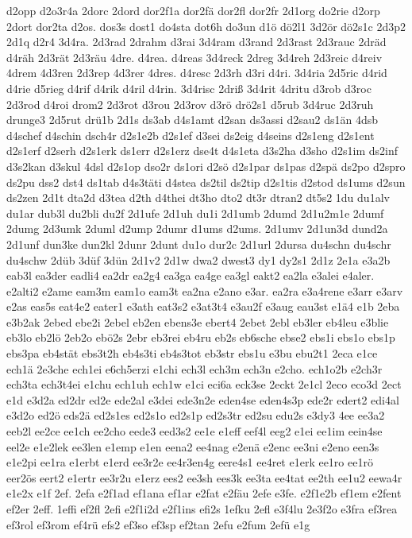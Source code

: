 {d2opp
d2o3r4a
2dorc
2dord
dor2f1a
dor2fä
dor2fl
dor2fr
2d1org
do2rie
d2orp
2dort
dor2ta
d2os.
dos3s
dost1
do4sta
dot6h
do3un
d1ö
dö2l1
3d2ör
dö2s1c
2d3p2
2d1q
d2r4
3d4ra.
2d3rad
2drahm
d3rai
3d4ram
d3rand
2d3rast
2d3rauc
2dräd
d4räh
2d3rät
2d3räu
4dre.
d4rea.
d4reas
3d4reck
2dreg
3d4reh
2d3reic
d4reiv
4drem
4d3ren
2d3rep
4d3rer
4dres.
d4resc
2d3rh
d3ri
d4ri.
3d4ria
2d5ric
d4rid
d4rie
d5rieg
d4rif
d4rik
d4ril
d4rin.
3d4risc
2driß
3d4rit
4dritu
d3rob
d3roc
2d3rod
d4roi
drom2
2d3rot
d3rou
2d3rov
d3rö
drö2s1
d5rub
3d4ruc
2d3ruh
drunge3
2d5rut
drü1b
2d1s
ds3ab
d4s1amt
d2san
ds3assi
d2sau2
ds1än
4dsb
d4schef
d4schin
dsch4r
d2s1e2b
d2s1ef
d3sei
ds2eig
d4seins
d2s1eng
d2s1ent
d2s1erf
d2serh
d2s1erk
ds1err
d2s1erz
dse4t
d4s1eta
d3s2ha
d3sho
d2s1im
ds2inf
d3s2kan
d3skul
4dsl
d2s1op
dso2r
ds1ori
d2sö
d2s1par
ds1pas
d2spä
ds2po
d2spro
ds2pu
dss2
dst4
ds1tab
d4s3täti
d4stea
ds2til
ds2tip
d2s1tis
d2stod
ds1ums
d2sun
ds2zen
2d1t
dta2d
d3tea
d2th
d4thei
dt3ho
dto2
dt3r
dtran2
dt5s2
1du
du1alv
du1ar
dub3l
du2bli
du2f
2d1ufe
2d1uh
du1i
2d1umb
2dumd
2d1u2m1e
2dumf
2dumg
2d3umk
2duml
d2ump
2dumr
d1ums
d2ums.
2d1umv
2d1un3d
dund2a
2d1unf
dun3ke
dun2kl
2dunr
2dunt
du1o
dur2c
2d1url
2dursa
du4schn
du4schr
du4schw
2düb
3düf
3dün
2d1v2
2d1w
dwa2
dwest3
dy1
dy2s1
2d1z
2e1a
e3a2b
eab3l
ea3der
eadli4
ea2dr
ea2g4
ea3ga
ea4ge
ea3gl
eakt2
ea2la
e3alei
e4aler.
e2alti2
e2ame
eam3m
eam1o
eam3t
ea2na
e2ano
e3ar.
ea2ra
e3a4rene
e3arr
e3arv
e2as
eas5s
eat4e2
eater1
e3ath
eat3s2
e3at3t4
e3au2f
e3aug
eau3st
e1ä4
e1b
2eba
e3b2ak
2ebed
ebe2i
2ebel
eb2en
ebens3e
ebert4
2ebet
2ebl
eb3ler
eb4leu
e3blie
eb3lo
eb2lö
2eb2o
ebö2s
2ebr
eb3rei
eb4ru
eb2s
eb6sche
ebse2
ebs1i
ebs1o
ebs1p
ebs3pa
eb4stät
ebs3t2h
eb4s3ti
eb4s3tot
eb3str
ebs1u
e3bu
ebu2t1
2eca
e1ce
ech1ä
2e3che
ech1ei
e6ch5erzi
e1chi
ech3l
ech3m
ech3n
e2cho.
ech1o2b
e2ch3r
ech3ta
ech3t4ei
e1chu
ech1uh
ech1w
e1ci
eci6a
eck3se
2eckt
2e1cl
2eco
eco3d
2ect
e1d
e3d2a
ed2dr
ed2e
ede2al
e3dei
ede3n2e
eden4se
eden4s3p
ede2r
edert2
edi4al
e3d2o
ed2ö
eds2ä
ed2s1es
ed2s1o
ed2s1p
ed2s3tr
ed2su
edu2s
e3dy3
4ee
ee3a2
eeb2l
ee2ce
ee1ch
ee2cho
eede3
eed3s2
ee1e
e1eff
eef4l
eeg2
e1ei
ee1im
eein4se
eel2e
e1e2lek
ee3len
e1emp
e1en
eena2
ee4nag
e2enä
e2enc
ee3ni
e2eno
een3s
e1e2pi
ee1ra
e1erbt
e1erd
ee3r2e
ee4r3en4g
eere4s1
ee4ret
e1erk
ee1ro
ee1rö
eer2ös
eert2
e1ertr
ee3r2u
e1erz
ees2
ee3sh
ees3k
ee3ta
ee4tat
ee2th
ee1u2
eewa4r
e1e2x
e1f
2ef.
2efa
e2f1ad
ef1ana
ef1ar
e2fat
e2fäu
2efe
e3fe.
e2f1e2b
ef1em
e2fent
ef2er
2eff.
1effi
ef2fl
2efi
e2f1i2d
e2f1ins
efi2s
1efku
2efl
e3f4lu
2e3f2o
e3fra
ef3rea
ef3rol
ef3rom
ef4rü
efs2
ef3so
ef3sp
ef2tan
2efu
e2fum
2efü
e1g
}
